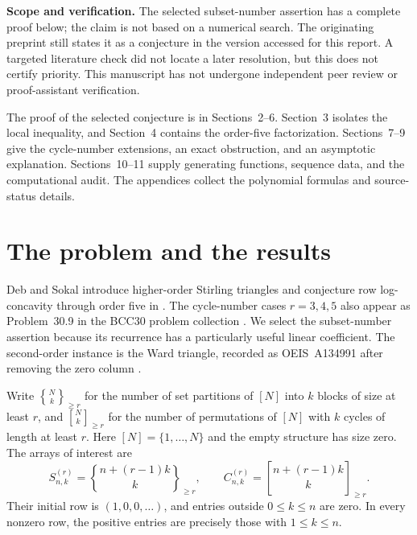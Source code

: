 \documentclass[11pt,a4paper]{article}
\numberwithin{equation}{section}
\theoremstyle{definition}
\theoremstyle{remark}
\newcommand{\Snum}[3]{S^{(#1)}_{#2,#3}}
\newcommand{\Cnum}[3]{C^{(#1)}_{#2,#3}}
\newcommand{\assocS}[3]{\genfrac\{\}{0pt}{}{#1}{#2}_{\!\ge #3}}
\newcommand{\assocC}[3]{\genfrac[]{0pt}{}{#1}{#2}_{\!\ge #3}}
\begin{document}
\begin{tcolorbox}
\textbf{Scope and verification.} The selected subset-number assertion has a
complete proof below; the claim is not based on a numerical search.
The originating preprint still states it as a conjecture in the version
accessed for this report. A targeted literature check did not locate a later
resolution, but this does not certify priority. This manuscript has not
undergone independent peer review or proof-assistant verification.
\end{tcolorbox}
\newpage
\tableofcontents
\vspace{0.9cm}
\begin{tcolorbox}[title={\bfseries Reading guide},colbacktitle=SoftOlive,
 coltitle=OliveInk]
The proof of the selected conjecture is in Sections~2--6.
Section~3 isolates the local inequality, and Section~4 contains the
order-five factorization. Sections~7--9 give the cycle-number extensions,
an exact obstruction, and an asymptotic explanation. Sections~10--11
supply generating functions, sequence data, and the computational audit.
The appendices collect the polynomial formulas and source-status details.
\end{tcolorbox}
\newpage

\section{The problem and the results}\label{sec:results}

Deb and Sokal introduce higher-order Stirling triangles and conjecture
row log-concavity through order five in
\cite[Conjectures~1.3(c) and 1.4(c)]{DebSokal}.
The cycle-number cases $r=3,4,5$ also appear as Problem~30.9 in the
BCC30 problem collection \cite{Cameron}. We select the subset-number
assertion because its recurrence has a particularly useful linear
coefficient. The second-order instance is the Ward triangle, recorded
as OEIS~A134991 after removing the zero column \cite{OEIS}.

Write $\assocS{N}{k}{r}$ for the number of set partitions of $[N]$ into
$k$ blocks of size at least $r$, and $\assocC{N}{k}{r}$ for the number
of permutations of $[N]$ with $k$ cycles of length at least $r$.
Here $[N]=\{1,\ldots,N\}$ and the empty structure has size zero.
The arrays of interest are
\begin{equation}\label{eq:definitions}
 \Snum r n k=\assocS{n+(r-1)k}{k}{r},\qquad
 \Cnum r n k=\assocC{n+(r-1)k}{k}{r}.
\end{equation}
Their initial row is $(1,0,0,\ldots)$, and entries outside $0\le k\le n$
are zero. In every nonzero row, the positive entries are precisely those
with $1\le k\le n$.
\end{document}
